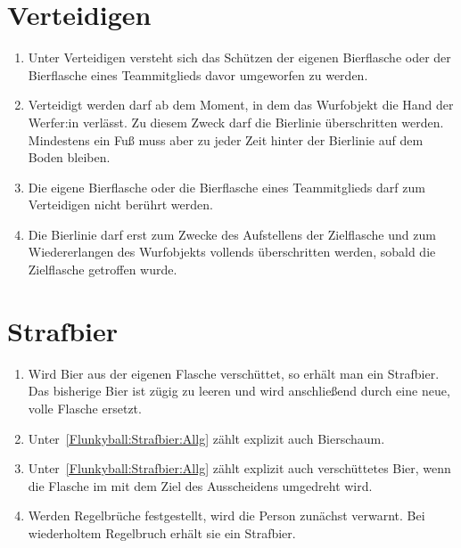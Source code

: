 \section{Verteidigen}
\begin{enumerate}[label={(\arabic*)}]
    \item
    Unter Verteidigen versteht sich das Schützen der eigenen Bierflasche oder der Bierflasche eines Teammitglieds davor umgeworfen zu werden.

    \item
    Verteidigt werden darf ab dem Moment, in dem das Wurfobjekt die Hand der Werfer:in verlässt.
    Zu diesem Zweck darf die Bierlinie überschritten werden.
    Mindestens ein Fuß muss aber zu jeder Zeit hinter der Bierlinie auf dem Boden bleiben.

    \item
    Die eigene Bierflasche oder die Bierflasche eines Teammitglieds darf zum Verteidigen nicht berührt werden.

    \item
    Die Bierlinie darf erst zum Zwecke des Aufstellens der Zielflasche und zum Wiedererlangen des Wurfobjekts vollends überschritten werden, sobald die Zielflasche getroffen wurde.
\end{enumerate}

\section{Strafbier}
\begin{enumerate}[label={(\arabic*)}]
    \item\label{Flunkyball:Strafbier:Allg}
    Wird Bier aus der eigenen Flasche verschüttet, so erhält man ein Strafbier.
    Das bisherige Bier ist zügig zu leeren und wird anschließend durch eine neue, volle Flasche ersetzt.

    \item
    Unter~\ref{Flunkyball:Strafbier:Allg} zählt explizit auch Bierschaum.

    \item
    Unter~\ref{Flunkyball:Strafbier:Allg} zählt explizit auch verschüttetes Bier, wenn die Flasche im mit dem Ziel des Ausscheidens umgedreht wird.

    \item
    Werden Regelbrüche festgestellt, wird die Person zunächst verwarnt.
    Bei wiederholtem Regelbruch erhält sie ein Strafbier.
\end{enumerate}

